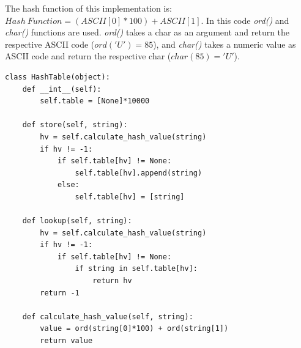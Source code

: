 The hash function of this implementation is: \(Hash \ Function = (ASCII[0]*100) + ASCII[1]\). In this code \textit{ord()} and \textit{char()} functions are used. \textit{ord()} takes a char as an argument and return the respective ASCII code (\(ord('U')=85\)), and \textit{char()} takes a numeric value as ASCII code and return the respective char (\(char(85)='U'\)).
\begin{lstlisting}[firstnumber=1, caption={String key implementation.}]
class HashTable(object):
	def __int__(self):
		self.table = [None]*10000
	
	def store(self, string):
		hv = self.calculate_hash_value(string)
		if hv != -1:
			if self.table[hv] != None:
				self.table[hv].append(string)
			else:
				self.table[hv] = [string]
	
	def lookup(self, string):
		hv = self.calculate_hash_value(string)
		if hv != -1:
			if self.table[hv] != None:
				if string in self.table[hv]:
					return hv
		return -1
	
	def calculate_hash_value(self, string):
		value = ord(string[0]*100) + ord(string[1])
		return value
\end{lstlisting}